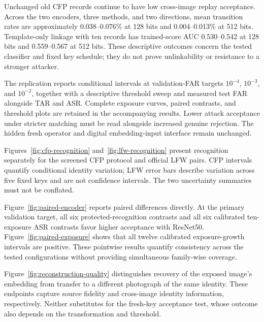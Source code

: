 Unchanged old CFP records continue to have low cross-image replay acceptance. Across the two encoders, three methods, and two directions, mean transition rates are approximately 0.038--0.076\% at 128 bits and 0.004--0.013\% at 512 bits. Template-only linkage with ten records has trained-score AUC 0.530--0.542 at 128 bits and 0.559--0.567 at 512 bits. These descriptive outcomes concern the tested classifier and fixed key schedule; they do not prove unlinkability or resistance to a stronger attacker.

The replication reports conditional intervals at validation-FAR targets $10^{-4}$, $10^{-3}$, and $10^{-2}$, together with a descriptive threshold sweep and measured test FAR alongside TAR and ASR. Complete exposure curves, paired contrasts, and threshold plots are retained in the accompanying results. Lower attack acceptance under stricter matching must be read alongside increased genuine rejection. The hidden fresh operator and digital embedding-input interface remain unchanged.


Figures~\ref{fig:cfp-recognition} and~\ref{fig:lfw-recognition} present recognition separately for the screened CFP protocol and official LFW pairs. CFP intervals quantify conditional identity variation; LFW error bars describe variation across five fixed keys and are not confidence intervals. The two uncertainty summaries must not be conflated.

Figure~\ref{fig:paired-encoder} reports paired differences directly. At the primary validation target, all six protected-recognition contrasts and all six calibrated ten-exposure ASR contrasts favor higher acceptance with ResNet50. Figure~\ref{fig:paired-exposure} shows that all twelve calibrated exposure-growth intervals are positive. These pointwise results quantify consistency across the tested configurations without providing simultaneous family-wise coverage.

Figure~\ref{fig:reconstruction-quality} distinguishes recovery of the exposed image's embedding from transfer to a different photograph of the same identity. These endpoints capture source fidelity and cross-image identity information, respectively. Neither substitutes for the fresh-key acceptance test, whose outcome also depends on the transformation and threshold.


